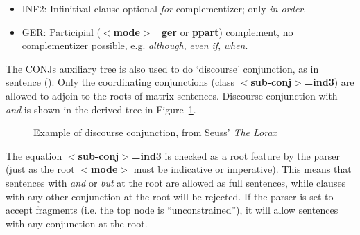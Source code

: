 \begin{itemize}
\item INF2: Infinitival clause optional {\it for} complementizer; only {\it
in order}.
\begin{itemize}
\end{itemize}

\item GER: Participial ({\bf $<$mode$>$=ger} or {\bf ppart}) complement, no
complementizer possible, e.g. {\it although}, {\it even if}, {\it
when}. 
\begin{itemize}
\end{itemize}

\end{itemize}

The CONJs auxiliary tree is also used to do `discourse' conjunction,
as in sentence ().  Only the coordinating conjunctions (class
{\bf $<$sub-conj$>$=ind3}) are allowed to adjoin to the roots of
matrix sentences. Discourse conjunction with {\it and} is shown in the
derived tree in Figure~\ref{seuss-sentence}.


\begin{figure}[h]
\centering
\hspace{0in}
\caption{Example of discourse conjunction, from Seuss' {\it The
Lorax}\nocite{seuss71}}
\label{seuss-sentence}
\end{figure}

The equation {\bf $<$sub-conj$>$=ind3} is checked as a root feature by
the parser (just as the root {\bf $<$mode$>$} must be indicative or
imperative).  This means that sentences with {\it and} or {\it but} at
the root are allowed as full sentences, while clauses with any other
conjunction at the root will be rejected. If the parser is set to
accept fragments (i.e. the top node is ``unconstrained''), it will
allow sentences with any conjunction at the root.





